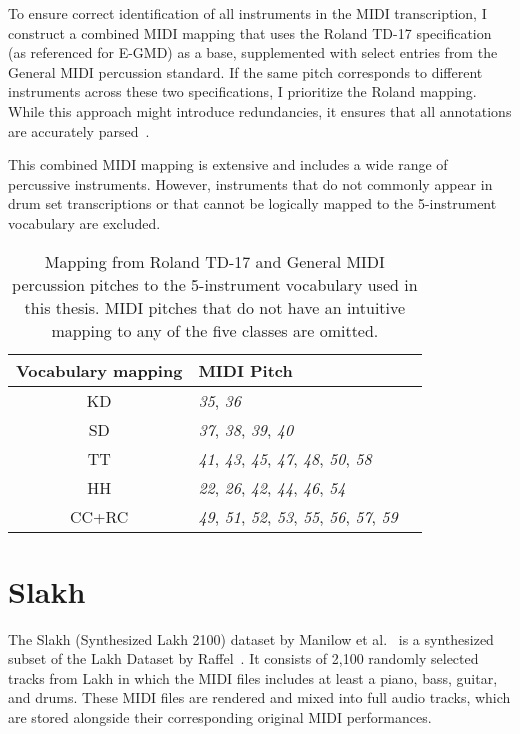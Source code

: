 To ensure correct identification of all instruments in the MIDI transcription, I construct a combined MIDI mapping that uses the Roland TD-17 specification (as referenced for E-GMD) as a base, supplemented with select entries from the General MIDI percussion standard. If the same pitch corresponds to different instruments across these two specifications, I prioritize the Roland mapping. While this approach might introduce redundancies, it ensures that all annotations are accurately parsed~\cite{pmlr-v97-gillick19a, callender2020improvingperceptualqualitydrum}.

This combined MIDI mapping is extensive and includes a wide range of percussive instruments. However, instruments that do not commonly appear in drum set transcriptions or that cannot be logically mapped to the 5-instrument vocabulary are excluded.

\begin{table}[H]
    \centering
    \hspace*{-0.6cm}
    \begin{tabular}{c|ll}
        Vocabulary mapping & MIDI Pitch \\
        \hline
        \acrfull{KD} & \textit{35}, \textit{36} \\
        \acrfull{SD} & \textit{37}, \textit{38}, \textit{39}, \textit{40} \\
        \acrfull{TT} & \textit{41}, \textit{43}, \textit{45}, \textit{47}, \textit{48}, \textit{50}, \textit{58} \\
        \acrfull{HH} & \textit{22}, \textit{26}, \textit{42}, \textit{44}, \textit{46}, \textit{54} \\
        \acrfull{CC+RC} & \textit{49}, \textit{51}, \textit{52}, \textit{53}, \textit{55}, \textit{56}, \textit{57}, \textit{59} \\
    \end{tabular}
    \caption{Mapping from Roland TD-17 and General MIDI percussion pitches to the 5-instrument vocabulary used in this thesis. MIDI pitches that do not have an intuitive mapping to any of the five classes are omitted.}
    \label{RolandMIDIMapping}
\end{table}

\section{Slakh}

The Slakh (Synthesized Lakh 2100) dataset by Manilow et al.~\cite{8937170} is a synthesized subset of the Lakh Dataset by Raffel~\cite{raffel2016learning}. It consists of 2,100 randomly selected tracks from Lakh in which the MIDI files includes at least a piano, bass, guitar, and drums. These MIDI files are rendered and mixed into full audio tracks, which are stored alongside their corresponding original MIDI performances.

